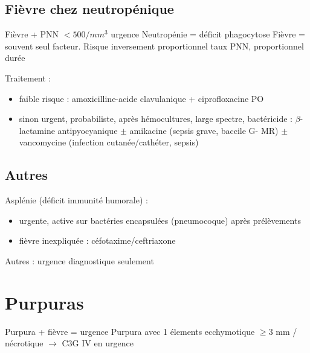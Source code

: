 \documentclass{article}
\begin{document}
\subsection{Fièvre chez neutropénique}
\label{sec:org077134a}
Fièvre + PNN \(< 500/mm^3\) urgence \skull
Neutropénie = déficit phagocytose
Fièvre = souvent seul facteur.
Risque inversement proportionnel taux PNN, proportionnel durée

Traitement :
\begin{itemize}
\item faible risque : amoxicilline-acide clavulanique + ciprofloxacine PO
\item sinon urgent, probabiliste, après hémocultures, large spectre, bactéricide : \(\beta\)-lactamine antipyocyanique \(\pm\) amikacine (sepsis grave, baccile G- MR) \(\pm\) vancomycine (infection cutanée/cathéter, sepsis)
\end{itemize}


\subsection{Autres}
\label{sec:org8c06c0e}
Asplénie (déficit immunité humorale) : 
\begin{itemize}
\item urgente, active sur bactéries encapsulées (pneumocoque) après prélèvements
\item fièvre inexpliquée : céfotaxime/ceftriaxone
\end{itemize}
Autres : urgence diagnostique seulement

\section{Purpuras}
\label{sec:orga164eae}
\danger Purpura + fièvre = urgence 
\danger Purpura avec 1 élements ecchymotique $\ge 3$ mm / nécrotique $\to$ C3G
IV en urgence \skull
\end{document}
